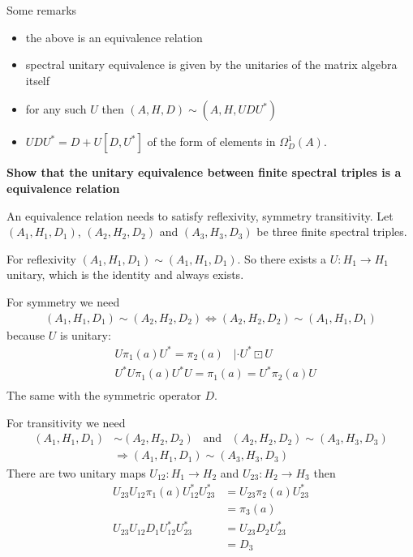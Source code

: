 \documentclass[a4paper]{article}
\newcounter{exercise}
\newenvironment{MyExercise}%
{\begin{mdframed}[style=exercisestyle]}{\end{mdframed}}
\theoremstyle{definition}
\theoremstyle{definition}
\theoremstyle{definition}
\theoremstyle{theorem}
\theoremstyle{theorem}
\begin{document}
Some remarks
\begin{itemize}
    \item the above is an equivalence relation
    \item spectral unitary equivalence is given by the unitaries of the
        matrix algebra itself
    \item for any such $U$ then $(A, H, D) \sim (A, H, UDU^*)$
    \item $UDU^* = D + U[D, U^*]$ of the form of elements in
        $\Omega _D^1 (A)$.
\end{itemize}

\begin{MyExercise}
    \textbf{
    Show that the unitary equivalence between finite spectral
    triples is a equivalence relation
}\newline

    An equivalence relation needs to satisfy reflexivity, symmetry
    transitivity.
    Let $(A_1, H_1, D_1)$, $(A_2, H_2, D_2)$ and $(A_3, H_3, D_3)$
    be three finite spectral triples.
    \newline

    For reflexivity $(A_1, H_1, D_1) \sim (A_1, H_1, D_1)$. So there
    exists a $U: H_1 \rightarrow H_1$ unitary, which is the identity
    and always exists.
    \newline

    For symmetry we need
    \begin{align*}
        (A_1, H_1, D_1) \sim (A_2, H_2, D_2) \Leftrightarrow
        (A_2, H_2, D_2) \sim (A_1, H_1, D_1)
    \end{align*}
    because $U$ is unitary:
    \begin{align*}
        &U\pi_1(a)U^* = \pi_2(a) \;\;\; | \cdot U^*\boxdot U \\
        &U^*U\pi_1(a)U^*U = \pi_1(a) = U^*\pi_2(a)U \\
    \end{align*}
    The same with the symmetric operator $D$.
    \newline

    For transitivity we need
    \begin{align*}
        (A_1, H_1, D_1) &\sim (A_2, H_2, D_2) \;\;\; \text{and} \;\;\;
        (A_2, H_2, D_2) \sim (A_3, H_3, D_3) \\
        &\Rightarrow (A_1, H_1, D_1) \sim (A_3, H_3, D_3)
    \end{align*}
    There are two unitary maps $U_{12}:H_1 \rightarrow H_2$ and
    $U_{23}: H_2 \rightarrow H_3$ then
    \begin{align*}
        U_{23}U_{12} \pi_1(a) U^*_{12}U^*_{23} &= U_{23}
        \pi_2(a) U_23^* \\
        &= \pi_3(a) \\
        U_{23}U_{12} D_1U^*_{12}U^*_{23} &= U_{23}
        D_2 U_23^* \\
        &= D_3
    \end{align*}
\end{MyExercise}
\end{document}
